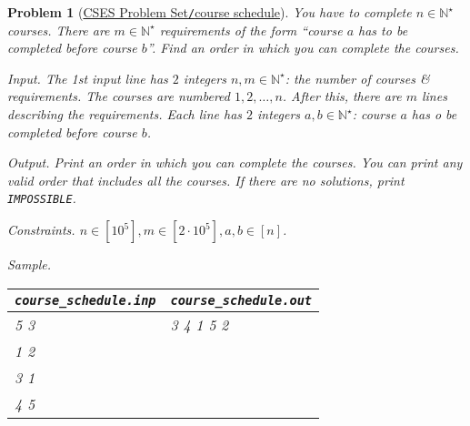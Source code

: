 \documentclass{article}
\newtheorem{problem}{Problem}
\begin{document}
\begin{problem}[\href{https://cses.fi/problemset/task/1679}{CSES Problem Set{\tt/}course schedule}]
    You have to complete $n\in\mathbb{N}^\star$ courses. There are $m\in\mathbb{N}^\star$ requirements of the form ``course $a$ has to be completed before course $b$''. Find an order in which you can complete the courses.
    \item {\sf Input.} The 1st input line has $2$ integers $n,m\in\mathbb{N}^\star$: the number of courses \& requirements. The courses are numbered $1,2,\ldots,n$. After this, there are $m$ lines describing the requirements. Each line has $2$ integers $a,b\in\mathbb{N}^\star$: course $a$ has o be completed before course $b$.
    \item {\sf Output.} Print an order in which you can complete the courses. You can print any valid order that includes all the courses. If there are no solutions, print {\tt IMPOSSIBLE}.
    \item {\sf Constraints.} $n\in[10^5],m\in[2\cdot10^5],a,b\in[n]$.
    \item {\sf Sample.}
    \begin{table}[H]
        \centering
        \begin{tabular}{|l|l|}
            \hline
            \verb|course_schedule.inp| & \verb|course_schedule.out| \\
            \hline
            5 3 & 3 4 1 5 2 \\
            1 2 & \\
            3 1 & \\
            4 5 & \\
            \hline
        \end{tabular}
    \end{table}
\end{problem}
\end{document}
